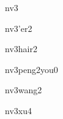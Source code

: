 \begin{multicols}{2}
\begin{verbete}[女]{nv3}
\end{verbete}

\begin{verbete}[女儿]{nv3'er2}
\end{verbete}

\begin{verbete}[女孩儿]{nv3hair2}
\end{verbete}

\begin{verbete}[女朋友]{nv3peng2you0}
\end{verbete}

\begin{verbete}[女王]{nv3wang2}
\end{verbete}

\begin{verbete}[女婿]{nv3xu4}
\end{verbete}

\end{multicols}
